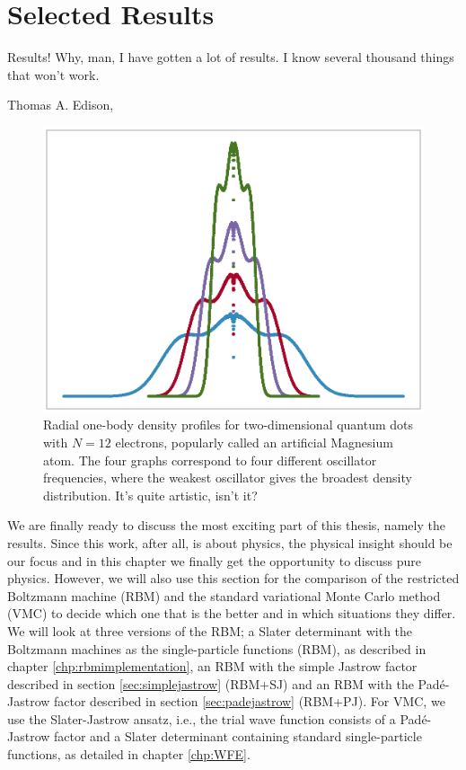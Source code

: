 \chapter{Selected Results} \label{chp:results}
\epigraph{Results! Why, man, I have gotten a lot of results. I know several thousand things that won't work.}{Thomas A. Edison, \cite{noauthor_edisonian_nodate}}
\begin{figure}[H]
	\centering
	\includegraphics[scale=0.6]{../Images/art.eps}
	\caption{Radial one-body density profiles for two-dimensional quantum dots with $N=12$ electrons, popularly called an artificial Magnesium atom. The four graphs correspond to four different oscillator frequencies, where the weakest oscillator gives the broadest density distribution. It's quite artistic, isn't it?}
\end{figure}

We are finally ready to discuss the most exciting part of this thesis, namely the results. Since this work, after all, is about physics, the physical insight should be our focus and in this chapter we finally get the opportunity to discuss pure physics. However, we will also use this section for the comparison of the restricted Boltzmann machine (RBM) and the standard variational Monte Carlo method (VMC) to decide which one that is the better and in which situations they differ. We will look at three versions of the RBM; a Slater determinant with the Boltzmann machines as the single-particle functions (RBM), as described in chapter \ref{chp:rbmimplementation}, an RBM with the simple Jastrow factor described in section \ref{sec:simplejastrow} (RBM+SJ) and an RBM with the Padé-Jastrow factor described in section \ref{sec:padejastrow} (RBM+PJ). For VMC, we use the Slater-Jastrow ansatz, i.e., the trial wave function consists of a Padé-Jastrow factor and a Slater determinant containing standard single-particle functions, as detailed in chapter \ref{chp:WFE}. 

